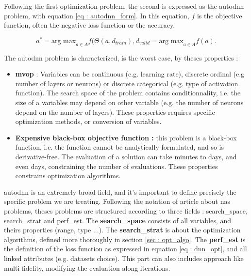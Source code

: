 Following the first optimization problem, the second is expressed as the \acrshort{autodnn} problem, with equation \ref{eq : autodnn_form}. In this equation, $f$ is the objective function, often the negative loss function or the accuracy. 

\begin{equation}
    a^* = \text{arg max}_{a\in A}f(\Theta (a, d_{train}), d_{valid}= \text{arg max}_{a \in A} f(a).
    \label{eq : autodnn_form}
\end{equation}

The \acrshort{autodnn} problem is characterized, is the worst case, by theses properties : 
\begin{itemize}
    \item \textbf{\acrfull{mvop}} : Variables can be continuous (e.g. learning rate), discrete ordinal (e.g number of layers or neurons) or discrete categorical (e.g. type of activation function). The search space of the problem contains conditionnality, i.e. the size of a variables may depend on other variable (e.g. the number of neurons depend on the number of layers). These properties requires specific optimization methods, or conversion of variables.
    \item \textbf{Expensive black-box objective function :} this problem is a black-box function, i.e. the function cannot be analytically formulated, and so is derivative-free. The evaluation of a solution can take minutes to days, and even days, constraining the number of evaluations. These properties constrains optimization algorithms.  
\end{itemize}

\acrshort{autodnn} is an extremely broad field, and it's important to define precisely the specific problem we are treating. Following the notation of article \cite{elsken_neural_2019} about \acrshort{nas} problems, theses problems are structured according to three fields : \Gls{search_space}, \Gls{search_strat} and \Gls{perf_est}. The \textbf{\gls{search_space}} consists of all variables, and theirs properties (range, type ...). The \textbf{\gls{search_strat}} is about the optimization algorithms, defined more thoroughly in section \ref{sec : opt_algo}. The \textbf{\gls{perf_est}} is the definition of the loss function as expressed in equation \ref{eq : dnn_opt}, and all linked attributes (e.g. datasets choice). This part can also includes approach like multi-fidelity, modifying the evaluation along iterations.



